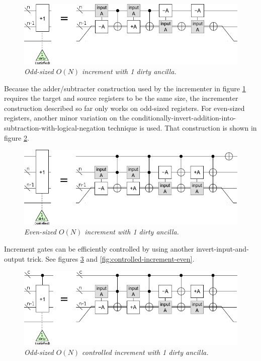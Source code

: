 \documentclass[twocolumn]{article}
\begin{document}
\begin{figure}
  \centering
  \includegraphics[width=\linewidth]{assets/increment-odd.png}
  \caption{\em Odd-sized $O(N)$ increment with 1 dirty ancilla.}
  \label{fig:increment-odd}
\end{figure}

Because the adder/subtracter construction used by the incrementer in figure \ref{fig:increment-odd} requires the target and source registers to be the same size, the incrementer construction described so far only works on odd-sized registers.
For even-sized registers, another minor variation on the conditionally-invert-addition-into-subtraction-with-logical-negation technique is used.
That construction is shown in figure \ref{fig:increment-even}.

\begin{figure}
  \centering
  \includegraphics[width=\linewidth]{assets/increment-even.png}
  \caption{\em Even-sized $O(N)$ increment with 1 dirty ancilla.}
  \label{fig:increment-even}
\end{figure}

Increment gates can be efficiently controlled by using another invert-input-and-output trick.
See figures \ref{fig:controlled-increment-odd} and \ref{fig:controlled-increment-even}.

\begin{figure}
  \centering
  \includegraphics[width=\linewidth]{assets/controlled-increment-odd.png}
  \caption{\em Odd-sized $O(N)$ controlled increment with 1 dirty ancilla.}
  \label{fig:controlled-increment-odd}
\end{figure}
\end{document}
